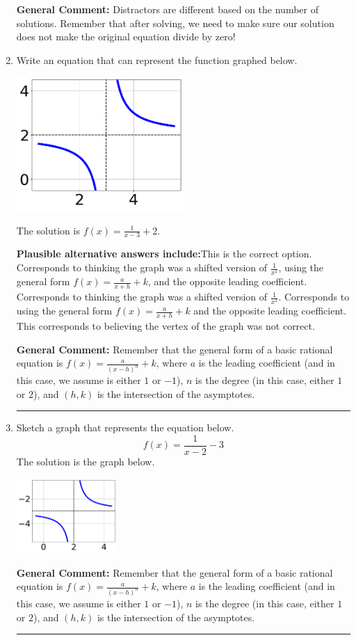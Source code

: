 \documentclass{extbook}[14pt]
\newcommand{\litem}[1]{\item #1

\rule{\textwidth}{0.4pt}}
\begin{document}
\begin{enumerate}
{\begin{enumerate}[label=\Alph*.]
\end{enumerate}

\textbf{General Comment:} Distractors are different based on the number of solutions. Remember that after solving, we need to make sure our solution does not make the original equation divide by zero!
}
\litem{
Write an equation that can represent the function graphed below.

\begin{center}
    \includegraphics[width=0.5\textwidth]{../Figures/rationalGraphToEquationCopyB.png}
\end{center}


The solution is \( f(x) = \frac{1}{x - 3} + 2 \).\begin{enumerate}[label=\Alph*.]
\textbf{Plausible alternative answers include:}This is the correct option.
Corresponds to thinking the graph was a shifted version of $\frac{1}{x^2}$, using the general form $f(x) = \frac{a}{x+h}+k$, and the opposite leading coefficient.
Corresponds to thinking the graph was a shifted version of $\frac{1}{x^2}$.
Corresponds to using the general form $f(x) = \frac{a}{x+h}+k$ and the opposite leading coefficient.
This corresponds to believing the vertex of the graph was not correct.
\end{enumerate}

\textbf{General Comment:} Remember that the general form of a basic rational equation is $ f(x) = \frac{a}{(x-h)^n} + k$, where $a$ is the leading coefficient (and in this case, we assume is either $1$ or $-1$), $n$ is the degree (in this case, either $1$ or $2$), and $(h, k)$ is the intersection of the asymptotes.
}
\litem{
Sketch a graph that represents the equation below.
\[ f(x) = \frac{1}{x - 2} - 3 \]The solution is the graph below.
    \begin{center}
        \includegraphics[width=0.3\textwidth]{../Figures/rationalEquationToGraphCopyAB.png}
    \end{center}

\textbf{General Comment:} Remember that the general form of a basic rational equation is $ f(x) = \frac{a}{(x-h)^n} + k$, where $a$ is the leading coefficient (and in this case, we assume is either $1$ or $-1$), $n$ is the degree (in this case, either $1$ or $2$), and $(h, k)$ is the intersection of the asymptotes.
}
\end{enumerate}
\end{document}
